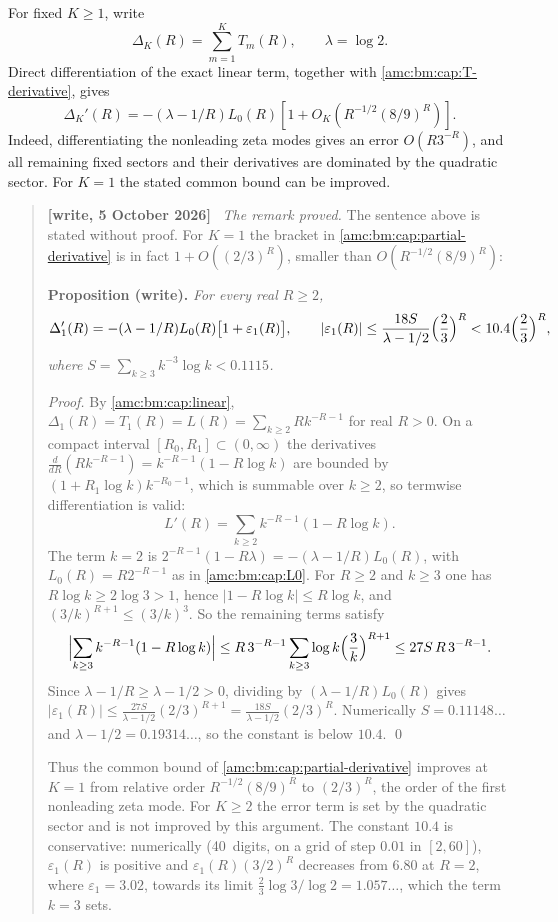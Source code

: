 \documentclass[11pt,letterpaper]{article}
\theoremstyle{remark}\newtheorem{remark}[theorem]{Remark}
\newenvironment{writenotedated}[1]{\par\smallskip\begin{quote}\small\textbf{[write, #1]}\ }{\end{quote}\smallskip}
\begin{document}
For fixed $K\ge1$, write
\[
 \Delta_K(R)=\sum_{m=1}^KT_m(R),\qquad \lambda=\log2.
\]
Direct differentiation of the exact linear term, together with \eqref{amc:bm:cap:T-derivative}, gives
\begin{equation}\label{amc:bm:cap:partial-derivative}
 \Delta_K'(R)=-(\lambda-1/R)L_0(R)
 \left[1+O_K\!\left(R^{-1/2}(8/9)^R\right)\right].
\end{equation}
Indeed, differentiating the nonleading zeta modes gives an error $O(R3^{-R})$, and all remaining fixed sectors and their derivatives are dominated by the quadratic sector. For $K=1$ the stated common bound can be improved.

\begin{writenotedated}{5 October 2026}
\emph{The remark proved.} The sentence above is stated without proof. For $K=1$ the bracket in \eqref{amc:bm:cap:partial-derivative} is in fact $1+O((2/3)^R)$, smaller than $O(R^{-1/2}(8/9)^R)$:

\smallskip\noindent\textbf{Proposition (write).} \emph{For every real $R\ge2$,
\[
 \Delta_1'(R)=-(\lambda-1/R)L_0(R)\bigl[1+\varepsilon_1(R)\bigr],\qquad
 |\varepsilon_1(R)|\le\frac{18S}{\lambda-1/2}\Bigl(\frac23\Bigr)^R<10.4\Bigl(\frac23\Bigr)^R,
\]
where $S=\sum_{k\ge3}k^{-3}\log k<0.1115$.}

\smallskip\noindent\emph{Proof.} By \eqref{amc:bm:cap:linear}, $\Delta_1(R)=T_1(R)=L(R)=\sum_{k\ge2}Rk^{-R-1}$ for real $R>0$. On a compact interval $[R_0,R_1]\subset(0,\infty)$ the derivatives $\frac{d}{dR}(Rk^{-R-1})=k^{-R-1}(1-R\log k)$ are bounded by $(1+R_1\log k)k^{-R_0-1}$, which is summable over $k\ge2$, so termwise differentiation is valid:
\[
 L'(R)=\sum_{k\ge2}k^{-R-1}(1-R\log k).
\]
The term $k=2$ is $2^{-R-1}(1-R\lambda)=-(\lambda-1/R)L_0(R)$, with $L_0(R)=R2^{-R-1}$ as in \eqref{amc:bm:cap:L0}. For $R\ge2$ and $k\ge3$ one has $R\log k\ge2\log3>1$, hence $|1-R\log k|\le R\log k$, and $(3/k)^{R+1}\le(3/k)^3$. So the remaining terms satisfy
\[
 \Bigl|\sum_{k\ge3}k^{-R-1}(1-R\log k)\Bigr|
 \le R\,3^{-R-1}\sum_{k\ge3}\log k\Bigl(\frac3k\Bigr)^{R+1}
 \le27S\,R\,3^{-R-1}.
\]
Since $\lambda-1/R\ge\lambda-1/2>0$, dividing by $(\lambda-1/R)L_0(R)$ gives $|\varepsilon_1(R)|\le\frac{27S}{\lambda-1/2}(2/3)^{R+1}=\frac{18S}{\lambda-1/2}(2/3)^R$. Numerically $S=0.11148\ldots$ and $\lambda-1/2=0.19314\ldots$, so the constant is below $10.4$. \qed

\smallskip\noindent Thus the common bound of \eqref{amc:bm:cap:partial-derivative} improves at $K=1$ from relative order $R^{-1/2}(8/9)^R$ to $(2/3)^R$, the order of the first nonleading zeta mode. For $K\ge2$ the error term is set by the quadratic sector and is not improved by this argument. The constant $10.4$ is conservative: numerically (40~digits, on a grid of step $0.01$ in $[2,60]$), $\varepsilon_1(R)$ is positive and $\varepsilon_1(R)(3/2)^R$ decreases from $6.80$ at $R=2$, where $\varepsilon_1=3.02$, towards its limit $\frac23\log3/\log2=1.057\ldots$, which the term $k=3$ sets.
\end{writenotedated}
\end{document}
